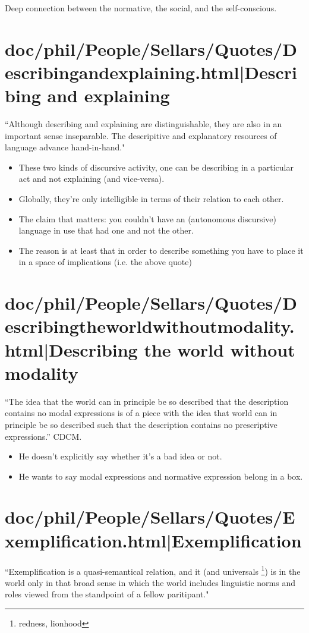 \documentclass[12pt,a4paper]{report}
\begin{document}
Deep connection between the normative, the social, and the self-conscious.
\section{doc/phil/People/Sellars/Quotes/Describingandexplaining.html|Describing and explaining}
``Although describing and explaining are distinguishable, they are also in an
important sense inseparable. The descripitive and explanatory resources of
language advance hand-in-hand."

\begin{itemize}
    \item  These two kinds of discursive activity, one can be describing in a
           particular act and not explaining (and vice-versa).
    \item Globally, they're only intelligible in terms of their relation to
          each other.
    \item The claim that matters: you couldn't have an  (autonomous discursive)
          language in use that had one and not the other.
    \item The reason is at least that in order to describe something you have
          to place it in a space of implications (i.e. the above quote)
\end{itemize}
\section{doc/phil/People/Sellars/Quotes/Describingtheworldwithoutmodality.html|Describing the world without modality}
``The idea that the world can in principle be so described that the description
contains no modal expressions is of a piece with the idea that world can in
principle be so described such that the description contains no prescriptive
expressions.'' CDCM.

\begin{itemize}
    \item He doesn't explicitly say whether it's a bad idea or not.
    \item He wants to say modal expressions and normative expression belong in
          a box.
\end{itemize}
\section{doc/phil/People/Sellars/Quotes/Exemplification.html|Exemplification}
``Exemplification is a quasi-semantical relation, and it (and universals
\footnote{redness, lionhood}) is in the world only in that broad sense in which the
world includes linguistic norms and roles viewed from the standpoint of a
fellow paritipant."
\end{document}
